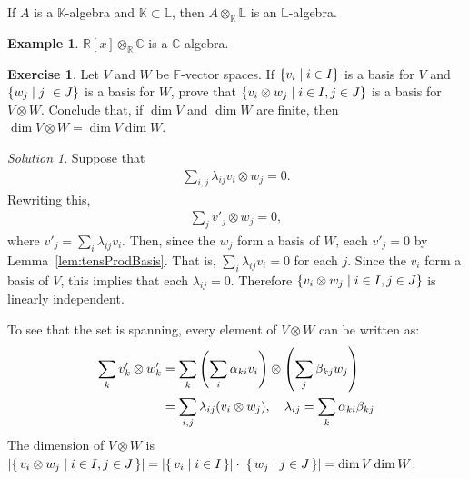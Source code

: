 \documentclass[svgnames]{article}
\theoremstyle{definition}
\newtheorem*{Example*}{Example}
\newtheorem{Exercise}{Exercise}
\theoremstyle{remark}
\newtheorem*{Solution*}{Solution}
\theoremstyle{underline}
\theoremstyle{underline}
\begin{document}
	If $A$ is a $\mathbb K$-algebra and $\mathbb K \subset \mathbb L$, then $A \otimes_{\mathbb K} \mathbb L$ is an $\mathbb L$-algebra.

	\begin{Example*}
		$\mathbb R[x] \otimes_{\mathbb R} \mathbb C$ is a $\mathbb C$-algebra.
	\end{Example*}

	\begin{Exercise}
		Let $V$ and $W$ be $\mathbb{F}$-vector spaces. If $\qty{v_i \mid i \in I}$ is a basis for $V$ and $\qty{w_j \mid j \
		\in J}$ is a basis for $W$, prove that $\qty{v_i \otimes w_j \mid i \in I, j \in J}$ is a basis for $V \otimes W$. Conclude that, if $\dim V$ and $\dim W$ are finite, then $\dim V \otimes W = \dim V \dim W$.
	\end{Exercise}
	\begin{Solution*}
		Suppose that
		\begin{gather*}
			\sum_{i,j} \lambda_{ij} v_i \otimes w_j = 0.
		\end{gather*}
		Rewriting this,
		\begin{gather*}
			\sum_j v'_j \otimes w_j = 0,
		\end{gather*}
		where $v'_j = \sum_i \lambda_{ij} v_i$. Then, since the $w_j$ form a basis of $W$, each $v'_j = 0$ by Lemma~\ref{lem:tensProdBasis}. That is, $\sum\limits_i \lambda_{ij} v_i = 0$ for each $j$. Since the $v_i$ form a basis of $V$, this implies that each $\lambda_{ij} = 0$. Therefore $\qty{v_i \otimes w_j \mid i \in I, j \in J}$ is linearly independent.
		
		To see that the set is spanning, every element of $V \otimes W$ can be written as:
		\begin{align*}
			\sum_{k} v'_k \otimes w'_k & = \sum_k \pqty{\sum_i \alpha_{ki} v_i} \otimes \pqty{\sum_j \beta_{kj} w_j} \\
				& = \sum_{i,j} \lambda_{ij} \pqty{v_i \otimes w_j}, \quad \lambda_{ij} = \sum_k \alpha_{ki} \beta_{kj}
		\end{align*}
		The dimension of $V \otimes W$ is $\abs{\qty{\, v_i \otimes w_j \mid i \in I, j \in J \,}} = \abs{\qty{\, v_i \mid i \in I \,} } \cdot \abs{\qty{\, w_j \mid j \in J \,}} = \dim V \dim W$.
	\end{Solution*}
\end{document}

